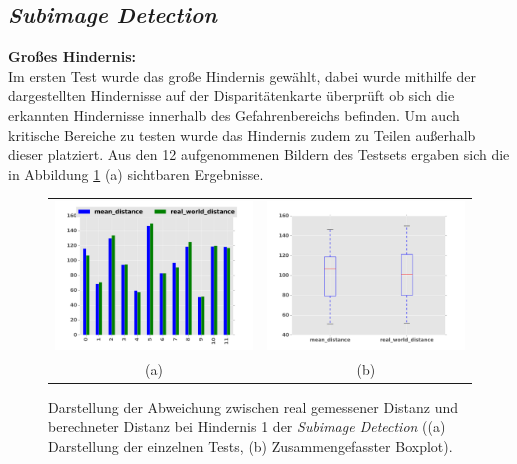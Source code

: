 \subsection{\emph{Subimage Detection}}
\label{sec:evaluierung_subimage}

\noindent
\textbf{Großes Hindernis:}\\ 
\noindent
Im ersten Test wurde das große Hindernis gewählt, dabei wurde mithilfe der dargestellten Hindernisse auf der Disparitätenkarte überprüft ob sich die erkannten Hindernisse innerhalb des Gefahrenbereichs befinden. Um auch kritische Bereiche zu testen wurde das Hindernis zudem zu Teilen außerhalb dieser platziert. Aus den 12 aufgenommenen Bildern des Testsets ergaben sich die in Abbildung \ref{fig:eval_big} (a) sichtbaren Ergebnisse.\\

\begin{figure}[h]
	\centering
	\begin{tabular}{cc}
	\includegraphics[width=7cm]{img/evaluation/diagrams/sub_big_bar}&
	\includegraphics[width=7cm]{img/evaluation/diagrams/sub_big_box}\\
	 (a) & (b)
	\end{tabular}
	\caption{Darstellung der Abweichung zwischen real gemessener Distanz und berechneter Distanz bei Hindernis 1 der \emph{Subimage Detection} ((a) Darstellung der einzelnen Tests, (b) Zusammengefasster Boxplot).}
    \label{fig:eval_big}
\end{figure}

